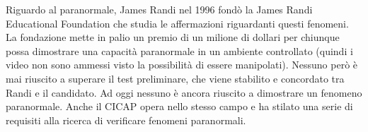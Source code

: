 \documentclass[12pt]{book} %
\begin{document}
\begin{mdframed}[linewidth=1pt]
Riguardo al paranormale, James Randi nel 1996 fondò la James Randi Educational Foundation che studia le
affermazioni riguardanti questi fenomeni. La fondazione mette in palio un premio di un milione di dollari per chiunque
possa dimostrare una capacità paranormale in un ambiente controllato (quindi i video non sono ammessi visto la possibilità di essere manipolati). 
Nessuno però è mai riuscito a superare il test preliminare, che viene
stabilito e concordato tra Randi e il candidato. Ad oggi nessuno è ancora riuscito a dimostrare un fenomeno paranormale.
Anche il CICAP opera nello stesso campo e ha stilato una serie di
requisiti alla ricerca di verificare fenomeni paranormali.
\end{mdframed}
\end{document}
